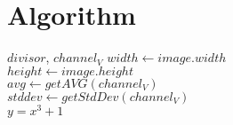 

\section{Algorithm}

    \begin{algorithm}
        \begin{algorithmic}
            \REQUIRE $divisor$, $channel_V$
            \STATE $width \gets image.width$\\
            \STATE $height \gets image.height$\\
            \STATE $avg \gets getAVG( channel_V )$\\
            \STATE $stddev \gets getStdDev( channel_V )$\\
            \ELSE
            \ENDIF
                \STATE $y = x^3 + 1$
            \ENDFOR
        \end{algorithmic}
    \end{algorithm}


